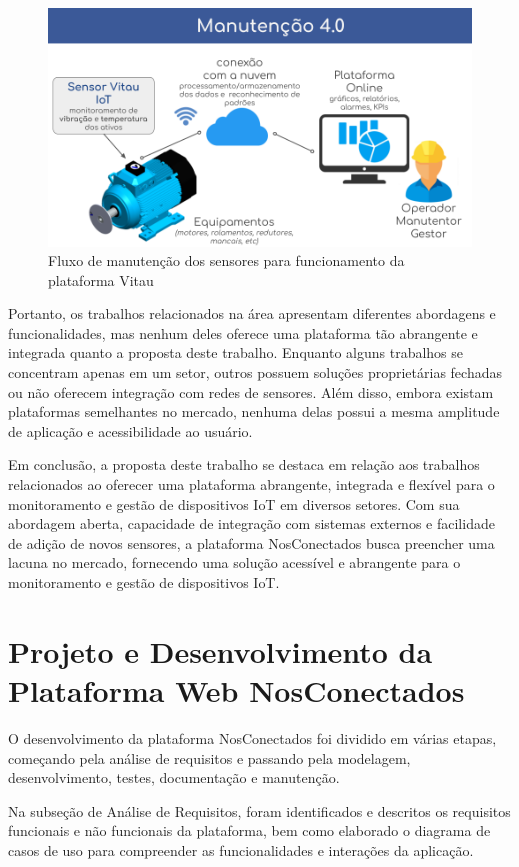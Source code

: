 \documentclass[tcc,capa]{texufpel}
\begin{document}
\begin{figure}[htbp]
  \centering \includegraphics[scale=.4]{assets/vitau.png}
  \caption{Fluxo de manutenção dos sensores para funcionamento da plataforma Vitau}
  \label{vitau}
\end{figure}
Portanto, os trabalhos relacionados na área apresentam diferentes abordagens e funcionalidades, mas nenhum deles oferece uma plataforma tão abrangente e integrada quanto a proposta deste trabalho. Enquanto alguns trabalhos se concentram apenas em um setor, outros possuem soluções proprietárias fechadas ou não oferecem integração com redes de sensores. Além disso, embora existam plataformas semelhantes no mercado, nenhuma delas possui a mesma amplitude de aplicação e acessibilidade ao usuário. 

Em conclusão, a proposta deste trabalho se destaca em relação aos trabalhos relacionados ao oferecer uma plataforma abrangente, integrada e flexível para o monitoramento e gestão de dispositivos IoT em diversos setores. Com sua abordagem aberta, capacidade de integração com sistemas externos e facilidade de adição de novos sensores, a plataforma NosConectados busca preencher uma lacuna no mercado, fornecendo uma solução acessível e abrangente para o monitoramento e gestão de dispositivos IoT.

\chapter{Projeto e Desenvolvimento da Plataforma Web NosConectados}
O desenvolvimento da plataforma NosConectados foi dividido em várias etapas, começando pela análise de requisitos e passando pela modelagem, desenvolvimento, testes, documentação e manutenção.

Na subseção de Análise de Requisitos, foram identificados e descritos os requisitos funcionais e não funcionais da plataforma, bem como elaborado o diagrama de casos de uso para compreender as funcionalidades e interações da aplicação.
\end{document}
